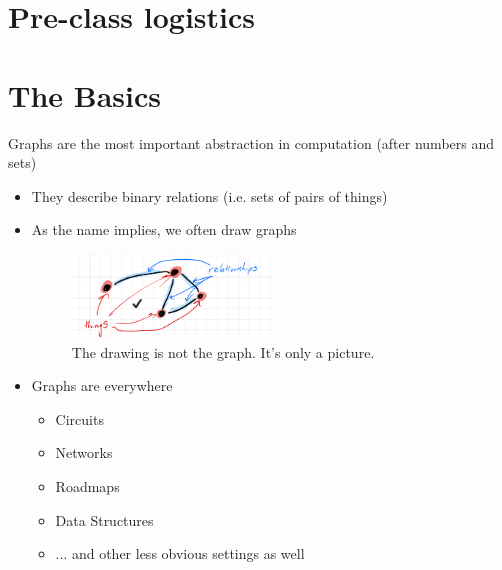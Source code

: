 \documentclass{article}
\begin{document}

\section{Pre-class logistics}
\section{The Basics}
Graphs are the most important abstraction in computation (after numbers and sets)
\begin{itemize}
    \item They describe binary relations (i.e. sets of pairs of things)
    
    \item As the name implies, we often draw graphs
     \begin{figure}[h]
    \centering
    \includegraphics[width=0.5\textwidth]{images/graphbasics.png}
    \caption{The drawing is not the graph. It's only a picture.}
    \label{fig:}
\end{figure}
    \item Graphs are everywhere
       \begin{itemize}
       \item Circuits
       \item Networks
       \item Roadmaps
       \item Data Structures
       \item ... and other less obvious settings as well
       \end{itemize}
     
\end{itemize}
\end{document}

